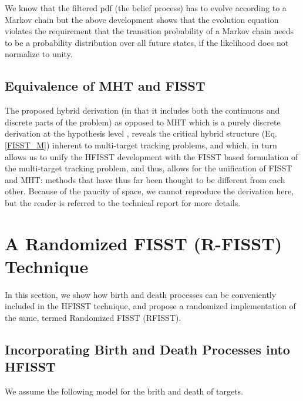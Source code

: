 \documentclass[10pt, conference]{IEEEtran}
\begin{document}
We know that the filtered pdf (the belief process) has to evolve according to a Markov chain \cite{bertsekas1, kumar1} but the above development shows that the evolution equation violates the requirement that the transition probability of a Markov chain needs to be a probability distribution over all future states,  if the likelihood does not normalize to unity.

\subsection{Equivalence of MHT and FISST}
The proposed hybrid derivation (in that it includes both the continuous and discrete parts of the problem) as opposed to MHT which is a purely discrete derivation at the hypothesis level \cite{HOMHT},  reveals the critical hybrid structure (Eq. \ref{FISST_M}) inherent to  multi-target tracking problems, and which, in turn  allows us to unify the HFISST development with the FISST based formulation of the multi-target tracking problem, and thus, allows for the unification of FISST and MHT: methods that have thus far been thought to be different from each other. Because of the paucity of space, we cannot reproduce the derivation here, but the reader is referred to the technical report \cite{HFISST_journal} for more details.




















\section{A Randomized FISST (R-FISST) Technique}
In this section, we show how birth and death processes can be conveniently included in the HFISST technique, and propose a randomized implementation of the same, termed Randomized FISST (RFISST).

\subsection{Incorporating Birth and Death Processes into HFISST}
We assume the following model for the brith and death of targets. 
\end{document}
